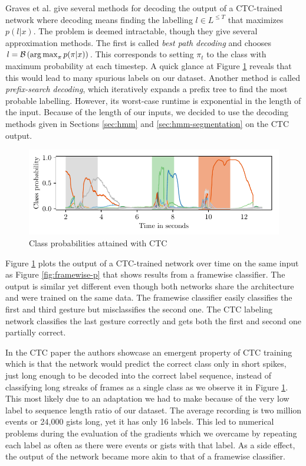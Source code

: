 Graves et al. give several methods for decoding the output of a CTC-trained
network where decoding means finding the labelling $l \in L^{\le T}$ that
maximizes $p(l | x)$. The problem is deemed intractable, though they give
several approximation methods. The first is called \emph{best path decoding} and
chooses $l = \mathcal{B}\left( \operatorname*{arg\,max}_{\pi} p(\pi | x) \right)$. This
corresponds to setting $\pi_{t}$ to the class with maximum probability at each
timestep. A quick glance at Figure \ref{fig:ctc-p} reveals that this would lead
to many spurious labels on our dataset. Another method is called
\emph{prefix-search decoding}, which iteratively expands a prefix tree to find
the most probable labelling. However, its worst-case runtime is exponential in
the length of the input. Because of the length of our inputs, we decided to use
the decoding methods given in Sections \ref{sec:hmm} and
\ref{sec:hmm-segmentation} on the CTC output.

\begin{figure}[h]
  \centering
  \includegraphics{figures/methods/ctc}
  \caption{Class probabilities attained with CTC}
  \label{fig:ctc-p}
\end{figure}

Figure \ref{fig:ctc-p} plots the output of a CTC-trained network over time on
the same input as Figure \ref{fig:framewise-p} that shows results from a
framewise classifier. The output is similar yet different even though both
networks share the architecture and were trained on the same data. The framewise
classifier easily classifies the first and third gesture but misclassifies the
second one. The CTC labeling network classifies the last gesture correctly and
gets both the first and second one partially correct.

In the CTC paper the authors showcase an emergent property of CTC training which
is that the network would predict the correct class only in short spikes, just
long enough to be decoded into the correct label sequence, instead of
classifying long streaks of frames as a single class as we observe it in Figure
\ref{fig:ctc-p}. This most likely due to an adaptation we had to make because of
the very low label to sequence length ratio of our dataset. The average
recording is two million events or 24,000 gists long, yet it has only 16 labels.
This led to numerical problems during the evaluation of the gradients which we
overcame by repeating each label as often as there were events or gists with
that label. As a side effect, the output of the network became more akin to that
of a framewise classifier.
